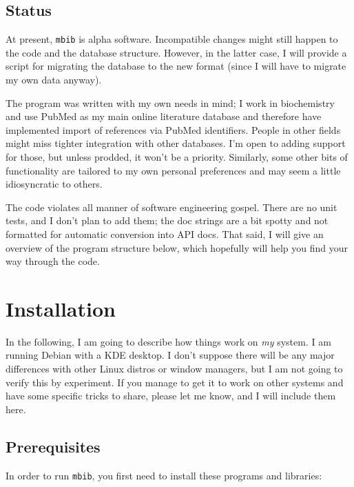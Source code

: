\documentclass[10pt]{article}
\newcommand*{\mbib}{\texttt{mbib}\xspace}
\begin{document}
%

\subsection{Status}

At present, \mbib is alpha software. Incompatible changes might still happen to the code and the database structure. However, in the latter case, I will provide a script for migrating the database to the new format (since I will have to migrate my own data anyway). 

The program was written with my own needs in mind; I work in biochemistry and use PubMed as my main online literature database and therefore have implemented import of references via PubMed identifiers. People in other fields might miss tighter integration with other databases. I'm open to adding support for those, but unless prodded, it won't be a priority. Similarly, some other bits of functionality are tailored to my own personal preferences and may seem a little idiosyncratic to others.

The code violates all manner of software engineering gospel. There are no unit tests, and I don't plan to add them; the doc strings are a bit spotty and not formatted for automatic conversion into API docs. That said, I will give an overview of the program structure below, which hopefully will help you find your way through the code. 

\section{Installation}

In the following, I am going to describe how things work on \emph{my} system. I am running Debian with a KDE desktop. I don't suppose there will be any major differences with other Linux distros or window managers, but I am not going to verify this by experiment. If you manage to get it to work on other systems and have some specific tricks to share, please let me know, and I will include them here.

\subsection{Prerequisites}

In order to run \mbib, you first need to install these programs and libraries:
\end{document}
